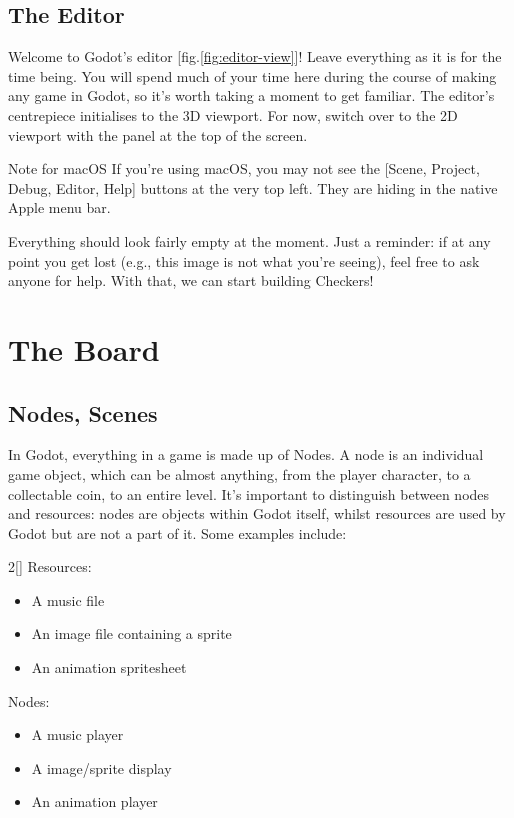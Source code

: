 \documentclass[14pt]{extarticle}
\newcommand{\prettyref}[2]{[{#1}.\ref{#2}]}
\begin{document}
\subsection*{The Editor}
Welcome to Godot's editor \prettyref{fig}{fig:editor-view}! Leave everything as it is for the time being. You will spend much of your time here during the course of making any game in Godot, so it's worth taking a moment to get familiar. The editor's centrepiece initialises to the 3D viewport. For now, switch over to the 2D viewport with the panel at the top of the screen.

\begin{callout-note}{Note for macOS}
If you're using macOS, you may not see the [Scene, Project, Debug, Editor, Help] buttons at the very top left. They are hiding in the native Apple menu bar.
\end{callout-note}

Everything should look fairly empty at the moment. Just a reminder: if at any point you get lost (e.g., this image is not what you’re seeing), feel free to ask anyone for help. With that, we can start building Checkers!


\newpage
\section{The Board}
\subsection*{Nodes, Scenes}
In Godot, everything in a game is made up of Nodes. A node is an individual game object, which can be almost anything, from the player character, to a collectable coin, to an entire level. It's important to distinguish between nodes and resources: nodes are objects within Godot itself, whilst resources are used by Godot but are not a part of it. Some examples include:

\begin{multicols}{2}[]
    Resources:
    \begin{itemize}
        \item A music file
        \item An image file containing a sprite
        \item An animation spritesheet
    \end{itemize}
    Nodes:
    \begin{itemize}
        \item A music player
        \item A image/sprite display
        \item An animation player
    \end{itemize}
\end{multicols}
\end{document}
